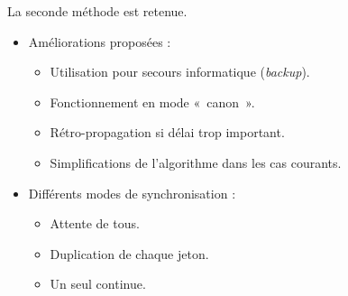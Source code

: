 \begin{frame}
	La seconde méthode est retenue.
	
	\begin{itemize}
		\item[\textbullet] Améliorations proposées : 
			\begin{itemize}
				\item Utilisation pour secours informatique (\textit{backup}).
				\item Fonctionnement en mode «~canon~».
				\item Rétro-propagation si délai trop important.
				\item Simplifications de l'algorithme dans les cas courants.
			\end{itemize}
		\vspace{1em}
		\item[\textbullet] Différents modes de synchronisation : 
			\begin{itemize}
				\item Attente de tous.
				\item Duplication de chaque jeton.
				\item Un seul continue.
			\end{itemize}
	\end{itemize}
\end{frame}